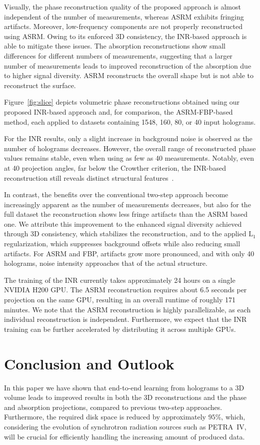 \documentclass{article}
\begin{document}
Visually, the phase reconstruction quality of the proposed approach is almost independent of the number of measurements, whereas ASRM exhibits fringing artifacts.
Moreover, low-frequency components are not properly reconstructed using ASRM.
Owing to its enforced 3D consistency, the INR-based approach is able to mitigate these issues.
The absorption reconstructions show small differences for different numbers of measurements, suggesting that a larger number of measurements leads to improved reconstruction of the absorption due to higher signal diversity.
ASRM reconstructs the overall shape but is not able to reconstruct the surface.

Figure~\ref{fig:slice} depicts volumetric phase reconstructions obtained using our proposed INR-based approach and, for comparison, the ASRM-FBP-based method, each applied to datasets containing 1548, 160, 80, or 40 input holograms.

For the INR results, only a slight increase in background noise is observed as the number of holograms decreases. However, the overall range of reconstructed phase values remains stable, even when using as few as 40 measurements.
Notably, even at 40 projection angles, far below the Crowther criterion, the INR-based reconstruction still reveals distinct structural features~\cite{crowtherReconstructionThreedimensionalStructure1997}.

In contrast, the benefits over the conventional two-step approach become increasingly apparent as the number of measurements decreases, but also for the full dataset the reconstruction shows less fringe artifacts than the ASRM based one.
We attribute this improvement to the enhanced signal diversity achieved through 3D consistency, which stabilizes the reconstruction, and to the applied $\mathrm{L}_1$ regularization, which suppresses background offsets while also reducing small artifacts.
For ASRM and FBP, artifacts grow more pronounced, and with only 40 holograms, noise intensity approaches that of the actual structure.

The training of the INR currently takes approximately 24 hours on a single NVIDIA H200 GPU.
The ASRM reconstruction requires about 6.5 seconds per projection on the same GPU, resulting in an overall runtime of roughly 171 minutes.
We note that the ASRM reconstruction is highly parallelizable, as each individual reconstruction is independent.
Furthermore, we expect that the INR training can be further accelerated by distributing it across multiple GPUs.

\section{Conclusion and Outlook}
In this paper we have shown that end-to-end learning from holograms to a 3D volume leads to improved results in both the 3D reconstructions and the phase and absorption projections, compared to previous two-step approaches. 
Furthermore, the required disk space is reduced by approximately \( 95\% \), which, considering the evolution of synchrotron radiation sources such as PETRA~IV, will be crucial for efficiently handling the increasing amount of produced data.
\end{document}
